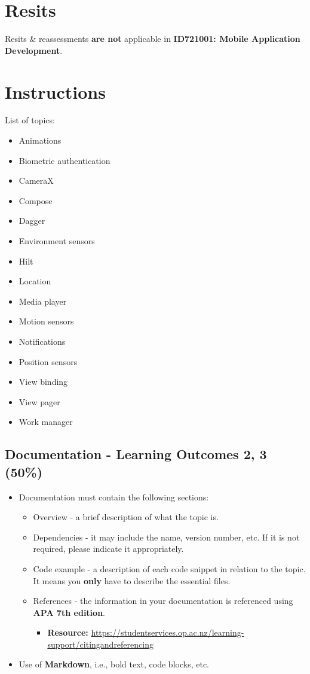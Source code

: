 \documentclass{article}
\begin{document}
\section*{Resits}
Resits \& reassessments \textbf{are not} applicable in \textbf{ID721001: Mobile Application Development}.

\section*{Instructions}

List of topics:

\begin{itemize}
	\item Animations
	\item Biometric authentication
	\item CameraX
	\item Compose
	\item Dagger
	\item Environment sensors
	\item Hilt
	\item Location
	\item Media player
	\item Motion sensors
	\item Notifications
	\item Position sensors
	\item View binding
	\item View pager
	\item Work manager
\end{itemize}

\subsection*{Documentation - Learning Outcomes 2, 3 (50\%)}
\begin{itemize}
	\item Documentation must contain the following sections:
	      \begin{itemize}
		      \item Overview - a brief description of what the topic is.
		      \item Dependencies - it may include the name, version number, etc. If it is not required, please indicate it appropriately.
		      \item Code example - a description of each code snippet in relation to the topic. It means you \textbf{only} have to describe the essential files.
		      \item References - the information in your documentation is referenced using \textbf{APA 7th edition}.
		            \begin{itemize}
			            \item \textbf{Resource:} \href{https://studentservices.op.ac.nz/learning-support/citingandreferencing}{https://studentservices.op.ac.nz/learning-support/citingandreferencing}
		            \end{itemize}
	      \end{itemize}
	\item Use of \textbf{Markdown}, i.e., bold text, code blocks, etc.
\end{itemize}
\end{document}
